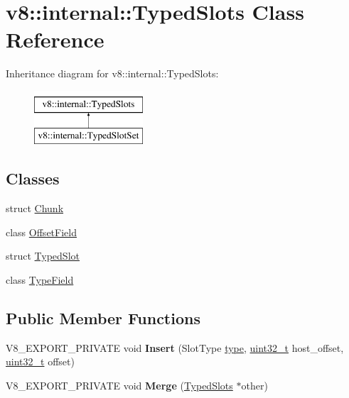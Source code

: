 \hypertarget{classv8_1_1internal_1_1TypedSlots}{}\section{v8\+:\+:internal\+:\+:Typed\+Slots Class Reference}
\label{classv8_1_1internal_1_1TypedSlots}
Inheritance diagram for v8\+:\+:internal\+:\+:Typed\+Slots\+:\begin{figure}[H]
\begin{center}
\leavevmode
\includegraphics[height=2.000000cm]{classv8_1_1internal_1_1TypedSlots}
\end{center}
\end{figure}
\subsection*{Classes}
\begin{DoxyCompactItemize}
\item 
struct \mbox{\hyperlink{structv8_1_1internal_1_1TypedSlots_1_1Chunk}{Chunk}}
\item 
class \mbox{\hyperlink{classv8_1_1internal_1_1TypedSlots_1_1OffsetField}{Offset\+Field}}
\item 
struct \mbox{\hyperlink{structv8_1_1internal_1_1TypedSlots_1_1TypedSlot}{Typed\+Slot}}
\item 
class \mbox{\hyperlink{classv8_1_1internal_1_1TypedSlots_1_1TypeField}{Type\+Field}}
\end{DoxyCompactItemize}
\subsection*{Public Member Functions}
\begin{DoxyCompactItemize}
\item 
\mbox{\label{classv8_1_1internal_1_1TypedSlots_a78b48c5e5424f929c9f1e384d33ea676}} 
V8\+\_\+\+E\+X\+P\+O\+R\+T\+\_\+\+P\+R\+I\+V\+A\+TE void {\bfseries Insert} (Slot\+Type \mbox{\hyperlink{classstd_1_1conditional_1_1type}{type}}, \mbox{\hyperlink{classuint32__t}{uint32\+\_\+t}} host\+\_\+offset, \mbox{\hyperlink{classuint32__t}{uint32\+\_\+t}} offset)
\item 
\mbox{\label{classv8_1_1internal_1_1TypedSlots_ab6f9d3955ebd1c8f4a8ea4dc77fc449f}} 
V8\+\_\+\+E\+X\+P\+O\+R\+T\+\_\+\+P\+R\+I\+V\+A\+TE void {\bfseries Merge} (\mbox{\hyperlink{classv8_1_1internal_1_1TypedSlots}{Typed\+Slots}} $\ast$other)
\end{DoxyCompactItemize}
